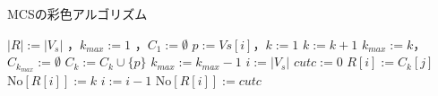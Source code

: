 \begin{algorithm}[htbp]
    \caption{MCSの彩色アルゴリズム} 
    \small
    \label{alg:NUMBER_SORT_R}
    \begin{algorithmic}[1]
		\State $|R|:=|V_s|$
		，$k_{max} :=1 $
	        ，$C_1 := \emptyset$
			\State $p:=Vs[i]$，$k:=1$
				\State $k := k+1$
			\EndWhile
				\State $k_{max}:=k$，$C_{k_{max}} := \emptyset$
			\EndIf
			\State $C_k := C_k \cup \{ p \} $
				\State {}
					\State $k_{max}:=k_{max}-1$
				\EndIf
			\EndIf
		\EndFor
		\State $i:=|V_s|$
		\State $cutc := 0$
		\EndIf
				\State $R[i]:=C_k[j]$
				\State $\mathrm{No}[ R[i] ]:=k$
				\State $i:=i-1$
			\EndFor
		\EndFor
			\State $\mathrm{No}[R[i]] := cutc$
		\EndIf
	\EndProcedure
    \end{algorithmic}
\end{algorithm}


